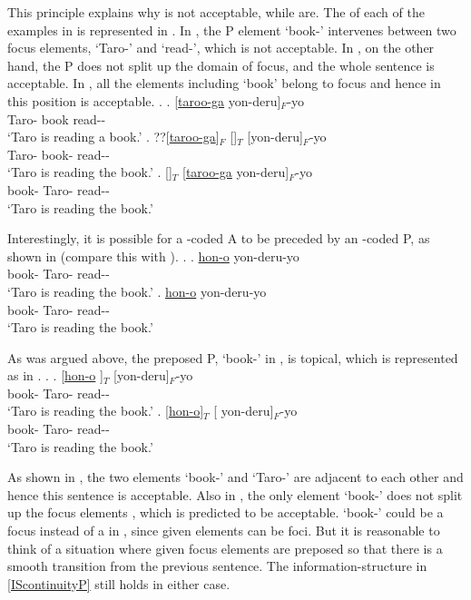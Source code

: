 This principle explains why \LLast[b] is not acceptable,
while \LLast[a,c] are.
The  of each of the examples in \LLast is represented in \Next.
In \Next[b],
the  P element  `book-' intervenes between two focus elements,  `Taro-' and  `read-', which is not acceptable.
In \Next[c], on the other hand,
the  P does not split up the domain of focus,
and the whole sentence is acceptable.
In \Next[a],
all the elements including  `book' belong to focus
and hence  in this position is acceptable.
%
\ex. \ag. [\ul{taroo-ga}  yon-deru]$_{F}$-yo \\
		Taro- book read-- \\
		`Taro is reading a book.'
	\bg. ??[\ul{taroo-ga}]$_{F}$ []$_{T}$ [yon-deru]$_{F}$-yo \\
		Taro- book- read-- \\
		`Taro is reading the book.'
	\bg. []$_{T}$ [\ul{taroo-ga} yon-deru]$_{F}$-yo \\
		book- Taro- read-- \\
		`Taro is reading the book.'

Interestingly,
it is possible for a -coded A to be preceded by an -coded P, as shown in \Next[a] (compare this with \Next[b]).
%
\ex.
\ag. \ul{hon-o}   yon-deru-yo \\
		book- Taro- read-- \\
		`Taro is reading the book.'
\bg. \ul{hon-o}  yon-deru-yo \\
		book- Taro- read-- \\
		`Taro is reading the book.'

\largerpage
As was argued above,
the preposed P,  `book-' in \Last,
is topical, which is represented as in \Next.
%
\ex.
\ag. [\ul{hon-o} ]$_{T}$  [yon-deru]$_{F}$-yo \\
		book- Taro- read-- \\
		`Taro is reading the book.'
\bg. [\ul{hon-o}]$_{T}$ [ yon-deru]$_{F}$-yo \\
		book- Taro- read-- \\
		`Taro is reading the book.'

As shown in \Last[a],
the two  elements  `book-' and  `Taro-' are adjacent to each other and hence this sentence is acceptable.
Also in \Last[b],
the only  element  `book-' does not split up the focus elements , which is predicted to be acceptable.
 `book-' could be a focus instead of a  in \LLast[b], since given elements can be foci.
But it is reasonable to think of a situation where given focus elements are preposed
so that there is a smooth transition from the previous sentence.
The information-structure  in \ref{IScontinuityP} still holds in either case.

